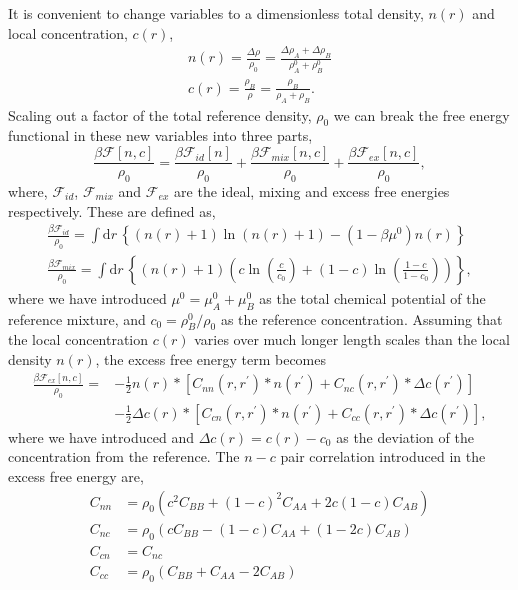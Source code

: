 \documentclass[showkeys, prb, reprint]{revtex4-1}
\newcommand{\F}{\mathcal{F}}    %
\renewcommand{\l}{\left}        %
\renewcommand{\r}{\right}       %
\newcommand{\f}{\frac}          %
\newcommand{\A}{\rho_A}         %
\newcommand{\B}{\rho_B}         %
\begin{document}
It is convenient to change variables to a dimensionless total density, $n(r)$
and local concentration, $c(r)$,
%
\begin{gather}
    n(r) = \f{\Delta \rho}{\rho_0} = \f{\Delta\A + \Delta\B}{\A^0 + \B^0} \\
    c(r) = \f{\B}{\rho} = \f{\B}{\A + \B}.
\end{gather}
%
Scaling out a factor of the total reference density, $\rho_0$ we can break the
free energy functional in these new variables into three parts,
%
\begin{equation}
    \label{binary_total_free_energy}
    \f{\beta\F[n, c]}{\rho_0} = \f{\beta\F_{id}[n]}{\rho_0} 
        + \f{\beta\F_{mix}[n, c]}{\rho_0}
        + \f{\beta\F_{ex}[n, c]}{\rho_0},
\end{equation}
%
where, $\F_{id}$, $\F_{mix}$ and $\F_{ex}$ are the ideal, mixing and excess
free energies respectively. These are defined as,
%
\begin{gather}
    \label{binary_ideal}
    \f{\beta\F_{id}}{\rho_0} =
        \int \mathrm{d}r \,\l\lbrace (n(r) + 1)\ln(n(r) + 1) 
        - (1 - \beta\mu^0)n(r) \r\rbrace \\
    \label{binary_mixing}
    \f{\beta\F_{mix}}{\rho_0} =
        \int \mathrm{d}r \,\l\lbrace (n(r) + 1)\l( 
            c\ln\l(\f{c}{c_0}\r) + (1-c)\ln\l(\f{1-c}{1-c_0}\r) \r)\r\rbrace, 
\end{gather}
%
where we have introduced $\mu^0=\mu_A^0+\mu_B^0$ as the total chemical
potential of the reference mixture, and $c_0 = \B^0 / \rho_0$ as the reference
concentration. Assuming that the local concentration $c(r)$ varies over much
longer length scales than the local density $n(r)$, the excess free energy term
becomes  
%
\begin{align}
    \label{binary_excess}
    \f{\beta\F_{ex}[n, c]}{\rho_0}
        = &-\f{1}{2} n(r) \ast \l[ 
            C_{nn}(r, r^\prime) \ast n(r^\prime) 
          + C_{nc}(r, r^\prime) \ast \Delta c(r^\prime)\r] \\
        &-\f{1}{2} \Delta c(r) \ast \l[
            C_{cn}(r, r^\prime) \ast n(r^\prime) 
          + C_{cc}(r, r^\prime) \ast \Delta c(r^\prime)\r], \nonumber
\end{align}
%
where we have introduced  and $\Delta c(r) = c(r) - c_0$ as the deviation of the 
concentration from the reference.  The $n-c$ pair correlation introduced in the 
excess free energy are,
%
\begin{align}
    C_{nn} &= \rho_0\l(c^2 C_{BB} + (1 - c)^2C_{AA} + 2c(1-c)C_{AB}\r) \label{binaryCs}\\
    C_{nc} &= \rho_0\l(c C_{BB} - (1 - c) C_{AA} + (1 - 2c)C_{AB}\r) \\
    C_{cn} &= C_{nc} \\
    C_{cc} &= \rho_0\l(C_{BB} + C_{AA} - 2 C_{AB}\r)
\end{align}
%
\end{document}
